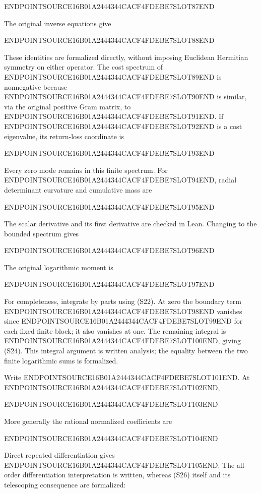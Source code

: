ENDPOINTSOURCE16B01A2444344CACF4FDEBE7SLOT87END

The original inverse equations give

ENDPOINTSOURCE16B01A2444344CACF4FDEBE7SLOT88END

These identities are formalized directly, without imposing Euclidean Hermitian symmetry on either operator. The cost spectrum of ENDPOINTSOURCE16B01A2444344CACF4FDEBE7SLOT89END is nonnegative because ENDPOINTSOURCE16B01A2444344CACF4FDEBE7SLOT90END is similar, via the original positive Gram matrix, to ENDPOINTSOURCE16B01A2444344CACF4FDEBE7SLOT91END. If ENDPOINTSOURCE16B01A2444344CACF4FDEBE7SLOT92END is a cost eigenvalue, its return-loss coordinate is

ENDPOINTSOURCE16B01A2444344CACF4FDEBE7SLOT93END

Every zero mode remains in this finite spectrum. For ENDPOINTSOURCE16B01A2444344CACF4FDEBE7SLOT94END, radial determinant curvature and cumulative mass are

ENDPOINTSOURCE16B01A2444344CACF4FDEBE7SLOT95END

The scalar derivative and its first derivative are checked in Lean. Changing to the bounded spectrum gives

ENDPOINTSOURCE16B01A2444344CACF4FDEBE7SLOT96END

The original logarithmic moment is

ENDPOINTSOURCE16B01A2444344CACF4FDEBE7SLOT97END

For completeness, integrate by parts using (S22). At zero the boundary term ENDPOINTSOURCE16B01A2444344CACF4FDEBE7SLOT98END vanishes since ENDPOINTSOURCE16B01A2444344CACF4FDEBE7SLOT99END for each fixed finite block; it also vanishes at one. The remaining integral is ENDPOINTSOURCE16B01A2444344CACF4FDEBE7SLOT100END, giving (S24). This integral argument is written analysis; the equality between the two finite logarithmic sums is formalized.

Write ENDPOINTSOURCE16B01A2444344CACF4FDEBE7SLOT101END. At ENDPOINTSOURCE16B01A2444344CACF4FDEBE7SLOT102END,

ENDPOINTSOURCE16B01A2444344CACF4FDEBE7SLOT103END

More generally the rational normalized coefficients are

ENDPOINTSOURCE16B01A2444344CACF4FDEBE7SLOT104END

Direct repeated differentiation gives ENDPOINTSOURCE16B01A2444344CACF4FDEBE7SLOT105END. The all-order differentiation interpretation is written, whereas (S26) itself and its telescoping consequence are formalized:

